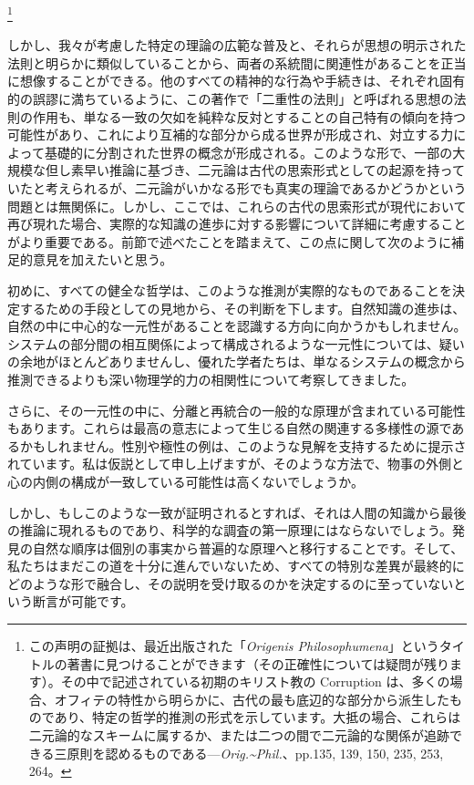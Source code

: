\documentclass[a4paper,11pt,openany]{ltjsbook}
\begin{document}
\footnote{この声明の証拠は、最近出版された「\textit{Origenis Philosophumena}」というタイトルの著書に見つけることができます（その正確性については疑問が残ります）。その中で記述されている初期のキリスト教の Corruption は、多くの場合、オフィテの特性から明らかに、古代の最も底辺的な部分から派生したものであり、特定の哲学的推測の形式を示しています。大抵の場合、これらは二元論的なスキームに属するか、または二つの間で二元論的な関係が追跡できる三原則を認めるものである---\textit{Orig.\textasciitilde{}Phil.}、pp.135, 139, 150, 235, 253, 264。}%

しかし、我々が考慮した特定の理論の広範な普及と、それらが思想の明示された法則と明らかに類似していることから、両者の系統間に関連性があることを正当に想像することができる。他のすべての精神的な行為や手続きは、それぞれ固有的の誤謬に満ちているように、この著作で「二重性の法則」と呼ばれる思想の法則の作用も、単なる一致の欠如を純粋な反対とすることの自己特有の傾向を持つ可能性があり、これにより互補的な部分から成る世界が形成され、対立する力によって基礎的に分割された世界の概念が形成される。このような形で、一部の大規模な但し素早い推論に基づき、二元論は古代の思索形式としての起源を持っていたと考えられるが、二元論がいかなる形でも真実の理論であるかどうかという問題とは無関係に。しかし、ここでは、これらの古代の思索形式が現代において再び現れた場合、実際的な知識の進歩に対する影響について詳細に考慮することがより重要である。前節で述べたことを踏まえて、この点に関して次のように補足的意見を加えたいと思う。

初めに、すべての健全な哲学は、このような推測が実際的なものであることを決定するための手段としての見地から、その判断を下します。自然知識の進歩は、自然の中に中心的な一元性があることを認識する方向に向かうかもしれません。システムの部分間の相互関係によって構成されるような一元性については、疑いの余地がほとんどありませんし、優れた学者たちは、単なるシステムの概念から推測できるよりも深い物理学的力の相関性について考察してきました。

さらに、その一元性の中に、分離と再統合の一般的な原理が含まれている可能性もあります。これらは最高の意志によって生じる自然の関連する多様性の源であるかもしれません。性別や極性の例は、このような見解を支持するために提示されています。私は仮説として申し上げますが、そのような方法で、物事の外側と心の内側の構成が一致している可能性は高くないでしょうか。

しかし、もしこのような一致が証明されるとすれば、それは人間の知識から最後の推論に現れるものであり、科学的な調査の第一原理にはならないでしょう。発見の自然な順序は個別の事実から普遍的な原理へと移行することです。そして、私たちはまだこの道を十分に進んでいないため、すべての特別な差異が最終的にどのような形で融合し、その説明を受け取るのかを決定するのに至っていないという断言が可能です。
\end{document}

